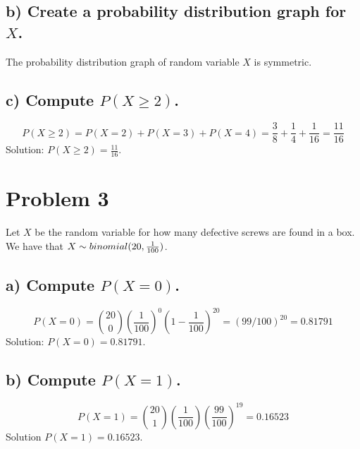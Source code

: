 \documentclass[11pt, letterpaper]{article}
\begin{document}
\subsection*{b) \normalfont Create a probability distribution graph for $X$.}
\begin{center}
\end{center}
The probability distribution graph of random variable $X$ is symmetric.
\subsection*{c) \normalfont Compute $P(X\geq 2)$.}
\[P(X\geq 2)=P(X=2)+P(X=3)+P(X=4)=\frac{3}{8}+\frac{1}{4}+\frac{1}{16}=\frac{11}{16}\]
Solution: $P(X\geq 2)=\frac{11}{16}$.

\section*{Problem 3}
Let $X$ be the random variable for how many defective screws are found in a box. 
We have that $X\sim binomial(20,\space \frac{1}{100})$.
\subsection*{a) \normalfont Compute $P(X=0)$.}
\[P(X=0)={20\choose 0}\left(\frac{1}{100}\right)^0\left(1-\frac{1}{100}\right)^{20}=(99/100)^20=0.81791\]
Solution: $P(X=0)=0.81791$.
\subsection*{b) \normalfont Compute $P(X=1)$.}
\[P(X=1)={20\choose 1}\left(\frac{1}{100}\right)\left(\frac{99}{100}\right)^{19}=0.16523\]
Solution $P(X=1)=0.16523$.
\end{document}
